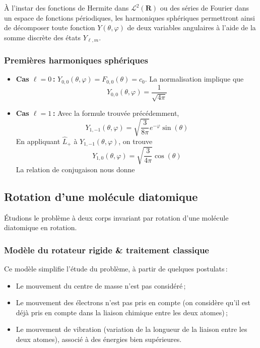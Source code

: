         À l’instar des fonctions de Hermite dans $\mathcal{L}^2(\mathbf{R})$ ou des séries de Fourier dans un espace de fonctions périodiques, les harmoniques sphériques permettront ainsi de décomposer toute fonction $Y(\theta, \varphi)$ de deux variables angulaires à l’aide de la somme discrète des états $Y_{\ell, m}$.

        \subsubsection{Premières harmoniques sphériques}

        \begin{itemize}
            \item \textbf{Cas $\ell = 0$ :} $Y_{0,0}(\theta, \varphi) = F_{0,0}(\theta) = c_0$. La normalisation implique que 
            \[ Y_{0,0}(\theta, \varphi) = \frac{1}{\sqrt{4\pi}} \]   
            \item \textbf{Cas $\ell = 1$ :} Avec la formule trouvée précédemment,
            \[ Y_{1, -1}(\theta, \varphi) = \sqrt{\frac{3}{8\pi}} e^{-\varphi} \sin(\theta) \]   
            En appliquant $\hat{L}_+$ à $Y_{1,-1}(\theta,\varphi)$, on trouve 
            \[ Y_{1,0}(\theta, \varphi) = \sqrt{\frac{3}{4\pi}} \cos(\theta) \]   
            La relation de conjugaison nous donne 
        \end{itemize}

    \subsection{Rotation d’une molécule diatomique}

        Étudions le problème à deux corps invariant par rotation d’une molécule diatomique en rotation.

        \subsubsection{Modèle du rotateur rigide \& traitement classique}

        Ce modèle simplifie l’étude du problème, à partir de quelques postulats :
        
        \begin{itemize}
            \item Le mouvement du centre de masse n’est pas considéré ;
            \item Le mouvement des électrons n’est pas pris en compte (on considère qu’il est déjà pris en compte dans la liaison chimique entre les deux atomes) ;
            \item Le mouvement de vibration (variation de la longueur de la liaison entre les deux atomes), associé à des énergies bien supérieures.
        \end{itemize}

